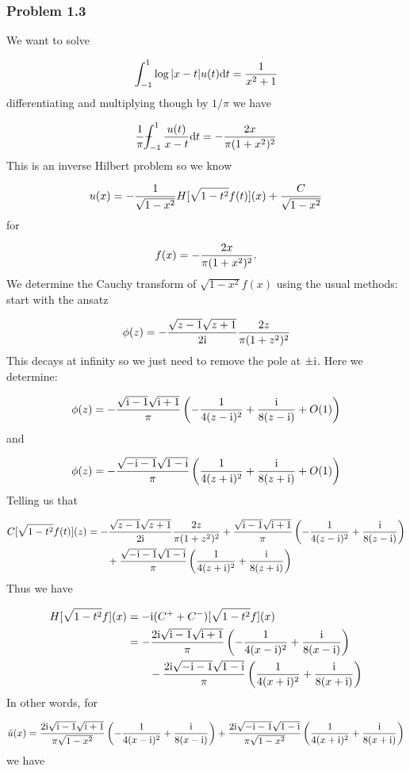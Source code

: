 \documentclass[12pt,a4paper]{article}
\def\D{ {\rm d} }
\def\I{ {\rm i} }
\def\Xint#1{ \mathchoice
   {\XXint\displaystyle\textstyle{#1} }%
   {\XXint\textstyle\scriptstyle{#1} }%
   {\XXint\scriptstyle\scriptscriptstyle{#1} }%
   {\XXint\scriptscriptstyle\scriptscriptstyle{#1} }%
   \!\int}
\def\XXint#1#2#3{ {\setbox0=\hbox{$#1{#2#3}{\int}$}
     \vcenter{\hbox{$#2#3$}}\kern-.5\wd0} }
\def\dashint{\Xint-}
\def\addtab#1={#1\;&=}
\def\ccr{\\\addtab}
\def\dt{\D t}
\def\addtab#1={#1\;&=}
\def\ccr{\\\addtab}
\begin{document}
\subsubsection{Problem 1.3}
We want to solve

\[
\int_{-1}^1 \log |x-t| u(t) \dt = {1 \over x^2 + 1}
\]
differentiating and multiplying though by $1/\pi$ we have

\[
{1 \over \pi} \dashint_{-1}^1 {u(t) \over x-t} \D t = -{2 x \over \pi (1+x^2)^2}
\]
This is an inverse Hilbert problem so we know

\[
u(x) = -{1 \over \sqrt{1-x^2} } H[\sqrt{1-t^2} f(t)](x)  + {C \over \sqrt{1-x^2}}
\]
for

\[
f(x) =  -{2 x \over \pi (1+x^2)^2}.
\]
We determine the Cauchy transform of $\sqrt{1-x^2} f(x)$ using the usual methods: start with the ansatz

\[
\phi(z) = -{\sqrt{z-1} \sqrt{z+1} \over 2 \I} {2 z \over \pi (1+z^2)^2}
\]
This decays at infinity so we just need to remove the pole at $\pm \I$. Here we determine:

\[
\phi(z) = -{\sqrt{\I -1 } \sqrt{\I + 1} \over \pi} \left(-{1  \over 4 (z-\I)^2}  + {\I \over 8  (z-\I)} + O(1) \right)
\]
and

\[
\phi(z) = -{\sqrt{-\I -1 } \sqrt{1-\I } \over \pi} \left({1  \over 4 (z+\I)^2}  + {\I \over 8  (z+\I)} + O(1) \right)
\]
Telling us that


\begin{align*}
C[\sqrt{1-t^2} f(t)](z) &=  -{\sqrt{z-1} \sqrt{z+1} \over 2 \I} {2 z \over \pi (1+z^2)^2} +  {\sqrt{\I -1 } \sqrt{\I + 1} \over \pi} \left(-{1  \over 4 (z-\I)^2}  + {\I \over 8  (z-\I)} \right) \\
&\qquad+  {\sqrt{-\I -1 } \sqrt{1-\I } \over \pi} \left({1  \over 4 (z+\I)^2}  + {\I \over 8  (z+\I)} \right)
\end{align*}
Thus we have


\begin{align*}
H[\sqrt{1-t^2} f](x) &= -\I (C^+ + C^-)[\sqrt{1-t^2} f](x) \ccr
= -  {2\I \sqrt{\I -1 } \sqrt{\I + 1} \over \pi} \left(-{1  \over 4 (x-\I)^2}  + {\I \over 8  (x-\I)} \right) \\
&\qquad-  {2\I \sqrt{-\I -1 } \sqrt{1-\I } \over \pi} \left({1  \over 4 (x+\I)^2}  + {\I \over 8  (x+\I)} \right)
\end{align*}
In other words, for

\[
\tilde u(x) = {2\I \sqrt{\I -1 } \sqrt{\I + 1} \over \pi \sqrt{1-x^2}} \left(-{1  \over 4 (x-\I)^2}  + {\I \over 8  (x-\I)} \right) +  {2\I \sqrt{-\I -1 } \sqrt{1-\I } \over \pi \sqrt{1-x^2}} \left({1  \over 4 (x+\I)^2}  + {\I \over 8  (x+\I)} \right)
\]
we have
\end{document}
